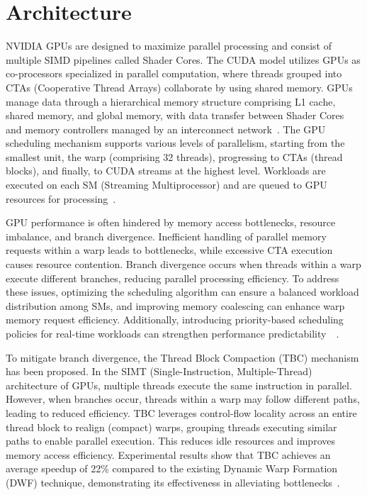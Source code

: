 \section{Architecture}

NVIDIA GPUs are designed to maximize parallel processing and consist of multiple SIMD pipelines called Shader Cores. The CUDA model utilizes GPUs as co-processors specialized in parallel computation, where threads grouped into CTAs (Cooperative Thread Arrays) collaborate by using shared memory. GPUs manage data through a hierarchical memory structure comprising L1 cache, shared memory, and global memory, with data transfer between Shader Cores and memory controllers managed by an interconnect network~\cite{Bakhoda2009}. The GPU scheduling mechanism supports various levels of parallelism, starting from the smallest unit, the warp (comprising 32 threads), progressing to CTAs (thread blocks), and finally, to CUDA streams at the highest level. Workloads are executed on each SM (Streaming Multiprocessor) and are queued to GPU resources for processing~\cite{Sanudo2020}.

GPU performance is often hindered by memory access bottlenecks, resource imbalance, and branch divergence. Inefficient handling of parallel memory requests within a warp leads to bottlenecks, while excessive CTA execution causes resource contention. Branch divergence occurs when threads within a warp execute different branches, reducing parallel processing efficiency. To address these issues, optimizing the scheduling algorithm can ensure a balanced workload distribution among SMs, and improving memory coalescing can enhance warp memory request efficiency. Additionally, introducing priority-based scheduling policies for real-time workloads can strengthen performance predictability~\cite{Bakhoda2009}~\cite{Sanudo2020}.

To mitigate branch divergence, the Thread Block Compaction (TBC) mechanism has been proposed. In the SIMT (Single-Instruction, Multiple-Thread) architecture of GPUs, multiple threads execute the same instruction in parallel. However, when branches occur, threads within a warp may follow different paths, leading to reduced efficiency. TBC leverages control-flow locality across an entire thread block to realign (compact) warps, grouping threads executing similar paths to enable parallel execution. This reduces idle resources and improves memory access efficiency. Experimental results show that TBC achieves an average speedup of 22\% compared to the existing Dynamic Warp Formation (DWF) technique, demonstrating its effectiveness in alleviating bottlenecks~\cite{Fung2011HPC}.

